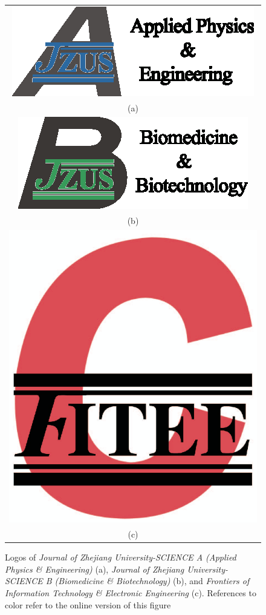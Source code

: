 \documentclass[twoside,twocolumn]{article}
\begin{document}
\begin{figure}[!htb]\small
\centering
\begin{tabular}{c}
\includegraphics[scale=0.9]{pics/jzusalogo.eps}\\
{\footnotesize\sf (a)} \\
\includegraphics[scale=0.9]{pics/jzusblogo.eps}\\
{\footnotesize\sf (b)} \\
\includegraphics[scale=0.26]{pics/fiteelogo.eps}\\
{\footnotesize\sf (c)} \\
\end{tabular}
\caption{Logos of \emph{Journal of Zhejiang University-SCIENCE A (Applied Physics {\sf \slshape \&} Engineering)} (a), \emph{Journal of Zhejiang University-SCIENCE B (Biomedicine {\sf \slshape \&} Biotechnology)} (b), and \emph{Frontiers of Information Technology {\sf \slshape \&} Electronic Engineering} (c). References to color refer to the online version of this figure}
\label{fig:logo}
\end{figure}
\end{document}
